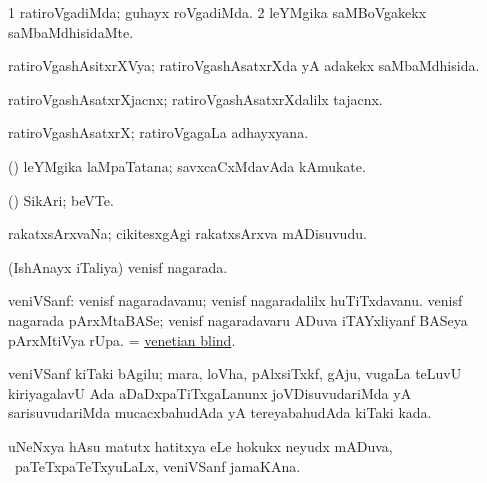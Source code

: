 \bentry
{} 
\gl{\kirxvi}
\expl{}
\bmng
\bnum
\num{1} ratiroVgadiMda; guhayx roVgadiMda. 
\num{2} leYMgika saMBoVgakekx saMbaMdhisidaMte. 
\enum
\emng
\eentry

\bentry
{} 
\gl{\gu}
\expl{}
\bmng
 ratiroVgashAsitxrXVya; ratiroVgashAsatxrXda yA adakekx saMbaMdhisida. 
\emng
\eentry

\bentry
{} 
\gl{\nA}
\expl{}
\bmng
 ratiroVgashAsatxrXjacnx; ratiroVgashAsatxrXdalilx tajacnx. 
\emng
\eentry

\bentry
{} 
\gl{\nA}
\expl{}
\bmng
 ratiroVgashAsatxrX; ratiroVgagaLa adhayxyana. 
\emng
\eentry

\bentry
{} 
\gl{\nA}
\expl{}
\bmng
(\pArxparx) leYMgika laMpaTatana; savxcaCxMdavAda kAmukate. 
\emng
\eentry

\bentry
{} 
\gl{\nA}
\expl{}
\bmng
 (\pArxparx) SikAri; beVTe. 
\emng
\eentry

\bentry
{} 
\gl{\nA}
\expl{}
\bmng
 rakatxsArxvaNa; cikitesxgAgi rakatxsArxva mADisuvudu. 
\emng
\eentry

\bentry
{} 
\gl{\gu}
\expl{}
\bmng
 (IshAnayx iTaliya) venisf nagarada. 
\emng
\eentry

\bentry
{} 
\gl{\nA}
\expl{}
\bmng
 veniVSanf: 
\banum
{} venisf nagaradavanu; venisf nagaradalilx huTiTxdavanu. 
 venisf nagarada pArxMtaBASe; venisf nagaradavaru ADuva iTAYxliyanf BASeya pArxMtiVya rUpa. 
  = \hyperlink{venetian blind}{venetian blind}. 
\eanum
\emng
\eentry

\bentry
{}
\gl{\nA}
\bmng
 veniVSanf kiTaki bAgilu; mara, loVha, pAlxsiTxkf, gAju, \mo vugaLa teLuvU kiriyagalavU Ada aDaDxpaTiTxgaLanunx joVDisuvudariMda yA sarisuvudariMda mucacxbahudAda yA tereyabahudAda kiTaki kada.  
\emng
\eentry

\bentry
{}
\gl{\nA}
\expl{}
\bmng
 uNeNxya hAsu matutx hatitxya eLe hokukx neyudx mADuva, \sA\ paTeTxpaTeTxyuLaLx, veniVSanf jamaKAna. 
\emng
\eentry

